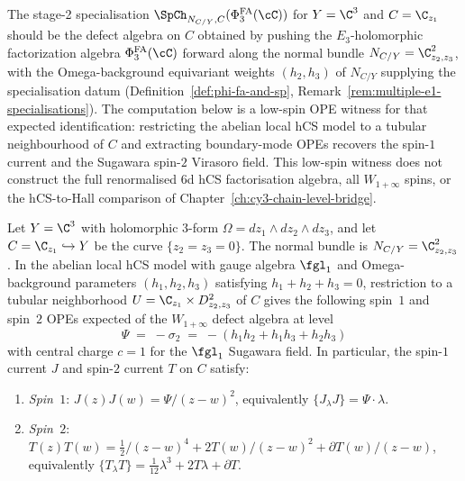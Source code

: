 The stage-2 specialisation $\SpCh_{N_{C/Y}, C}(\PhiFA_3(\cC))$ for
$Y = \C^3$ and $C = \C_{z_1}$ should be the defect algebra on $C$
obtained by pushing the $E_3$-holomorphic factorization algebra
$\PhiFA_3(\cC)$ forward along the normal bundle
$N_{C/Y} = \C^2_{z_2, z_3}$, with the Omega-background equivariant
weights $(h_2, h_3)$ of $N_{C/Y}$ supplying the specialisation datum
(Definition~\ref{def:phi-fa-and-sp}, Remark~\ref{rem:multiple-e1-specialisations}).
The computation below is a low-spin OPE witness for that expected
identification: restricting the abelian local hCS model to a tubular
neighbourhood of \(C\) and extracting boundary-mode OPEs recovers the
spin-\(1\) current and the Sugawara spin-\(2\) Virasoro field. This
low-spin witness does not construct the full
renormalised 6d hCS factorisation algebra, all $W_{1+\infty}$ spins, or
the hCS-to-Hall comparison of Chapter~\ref{ch:cy3-chain-level-bridge}.

\begin{proposition}
\label{prop:codim2-defect-ope}
Let $Y = \C^3$ with holomorphic $3$-form $\Omega = dz_1 \wedge dz_2 \wedge dz_3$, and let $C = \C_{z_1} \hookrightarrow Y$ be the curve $\{z_2 = z_3 = 0\}$. The normal bundle is $N_{C/Y} = \C^2_{z_2, z_3}$. In the abelian local hCS model with gauge algebra $\fgl_1$ and Omega-background parameters $(h_1, h_2, h_3)$ satisfying $h_1 + h_2 + h_3 = 0$, restriction to a tubular neighborhood $U = \C_{z_1} \times D^2_{z_2, z_3}$ of $C$ gives the following spin~$1$ and spin~$2$ OPEs expected of the $W_{1+\infty}$ defect algebra at level
\[
 \Psi \;=\; -\sigma_2 \;=\; -(h_1 h_2 + h_1 h_3 + h_2 h_3)
\]
with central charge $c = 1$ for the $\fgl_1$ Sugawara field. In particular, the spin-$1$ current $J$ and spin-$2$ current $T$ on $C$ satisfy:
\begin{enumerate}[label=\textup{(\alph*)}]
 \item \emph{Spin~$1$}: $J(z) J(w) = \Psi/(z - w)^2$, equivalently $\{J_\lambda J\} = \Psi \cdot \lambda$.
 \item \emph{Spin~$2$}: $T(z) T(w) = \tfrac{1}{2}/(z - w)^4 + 2T(w)/(z - w)^2 + \partial T(w)/(z - w)$, equivalently $\{T_\lambda T\} = \tfrac{1}{12}\lambda^3 + 2T\lambda + \partial T$.
\end{enumerate}
\end{proposition}


